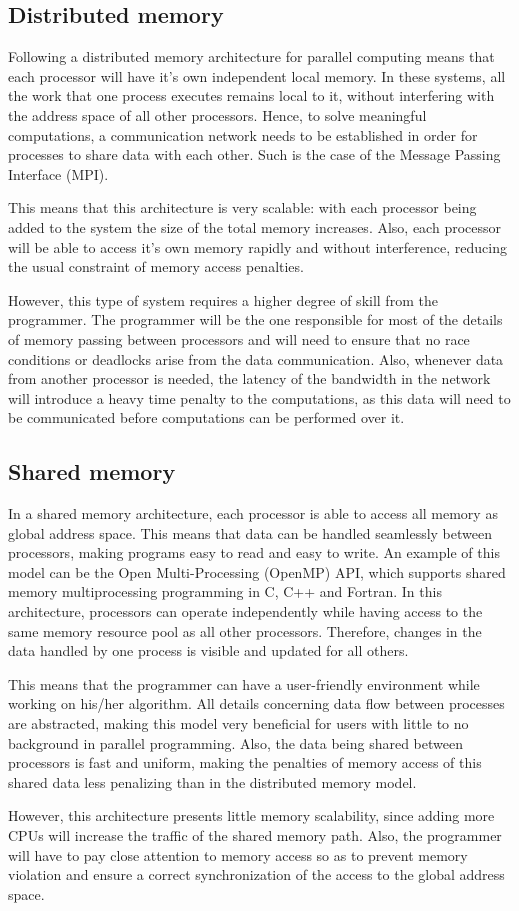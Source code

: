 \documentclass[12pt, openany]{book}
\begin{document}
\subsection{Distributed memory}
Following a distributed memory architecture for parallel computing means that each processor will have it's own independent local memory. In these systems, all the work that one process executes remains local to it, without interfering with the address space of all other processors. Hence, to solve meaningful computations, a communication network needs to be established in order for processes to share data with each other. Such is the case of the Message Passing Interface (MPI).\par
This means that this architecture is very scalable: with each processor being added to the system the size of the total memory increases. Also, each processor will be able to access it's own memory rapidly and without interference, reducing the usual constraint of memory access penalties.
\par However, this type of system requires a higher degree of skill from the programmer. The programmer will be the one responsible for most of the details of memory passing between processors and will need to ensure that no race conditions or deadlocks arise from the data communication. Also, whenever data from another processor is needed, the latency of the bandwidth in the network will introduce a heavy time penalty to the computations, as this data will need to be communicated before computations can be performed over it.
\subsection{Shared memory}
In a shared memory architecture, each processor is able to access all memory as global address space. This means that data can be handled seamlessly between processors, making programs easy to read and easy to write. An example of this model can be the Open Multi-Processing (OpenMP) API, which supports shared memory multiprocessing programming in C, C++ and Fortran. In this architecture, processors can operate independently while having access to the same memory resource pool as all other processors. Therefore, changes in the data handled by one process is visible and updated for all others. \par
This means that the programmer can have a user-friendly environment while working on his/her algorithm. All details concerning data flow between processes are abstracted, making this model very beneficial for users with little to no background in parallel programming. Also, the data being shared between processors is fast and uniform, making the penalties of memory access of this shared data less penalizing than in the distributed memory model.
\par However, this architecture presents little memory scalability, since adding more CPUs will increase the traffic of the shared memory path. Also, the programmer will have to pay close attention to memory access so as to prevent memory violation and ensure a correct synchronization of the access to the global address space.
\end{document}
